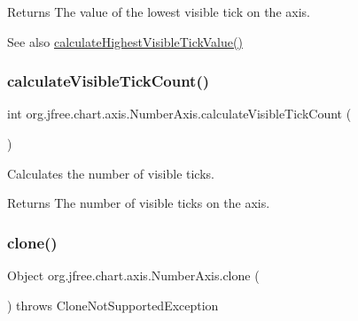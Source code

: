\begin{DoxyReturn}{Returns}
The value of the lowest visible tick on the axis.
\end{DoxyReturn}
\begin{DoxySeeAlso}{See also}
\mbox{\hyperlink{classorg_1_1jfree_1_1chart_1_1axis_1_1_number_axis_a0289af2e8c0ee3949cd3e833b2566239}{calculate\+Highest\+Visible\+Tick\+Value()}} 
\end{DoxySeeAlso}
\mbox{\label{classorg_1_1jfree_1_1chart_1_1axis_1_1_number_axis_aa4f2d1208143bd71e100afddf0a96c78}} 
\subsubsection{\texorpdfstring{calculate\+Visible\+Tick\+Count()}{calculateVisibleTickCount()}}
{\footnotesize\ttfamily int org.\+jfree.\+chart.\+axis.\+Number\+Axis.\+calculate\+Visible\+Tick\+Count (\begin{DoxyParamCaption}{ }\end{DoxyParamCaption})\hspace{0.3cm}{\ttfamily [protected]}}

Calculates the number of visible ticks.

\begin{DoxyReturn}{Returns}
The number of visible ticks on the axis. 
\end{DoxyReturn}
\mbox{\label{classorg_1_1jfree_1_1chart_1_1axis_1_1_number_axis_af175ffb380db044f3c4a307dfa5575ef}} 
\subsubsection{\texorpdfstring{clone()}{clone()}}
{\footnotesize\ttfamily Object org.\+jfree.\+chart.\+axis.\+Number\+Axis.\+clone (\begin{DoxyParamCaption}{ }\end{DoxyParamCaption}) throws Clone\+Not\+Supported\+Exception}

